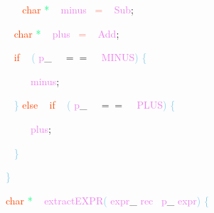 \documentclass[8, usernames, dvipsnames]{beamer}
\begin{document}
\begin{frame}
\textcolor{White}{\   }
\textcolor{White}{\   }
\textcolor{OrangeRed}{char}
\textcolor{SpringGreen}{*}
\textcolor{White}{\ }
\textcolor{Violet}{minus}\textcolor{White}{\ }
\textcolor{Salmon}{=}
\textcolor{White}{\ }
\textcolor{Violet}{Sub}\textcolor{Sepia}{;}

 \textcolor{White}{\   }
\textcolor{OrangeRed}{char}
\textcolor{SpringGreen}{*}
\textcolor{White}{\ }
\textcolor{Violet}{plus}\textcolor{White}{\ }
\textcolor{Salmon}{=}
\textcolor{White}{\ }
\textcolor{Violet}{Add}\textcolor{Sepia}{;}

 \textcolor{White}{\   }
\textcolor{OrangeRed}{if}
\textcolor{White}{\ }
\textcolor{SkyBlue}{(}
\textcolor{Violet}{p}\textcolor{Sepia}{\_}
\textcolor{White}{\ }
\textcolor{OliveGreen}{$==$}
\textcolor{White}{\ }
\textcolor{Violet}{MINUS}\textcolor{SkyBlue}{)}
\textcolor{SkyBlue}{\{ }

 \textcolor{White}{\   }
\textcolor{White}{\   }
\textcolor{OrangeRed}{	}
\textcolor{White}{\ }
\textcolor{Violet}{minus}\textcolor{Sepia}{;}

 \textcolor{White}{\   }
\textcolor{SkyBlue}{\} }
\textcolor{OrangeRed}{else}
\textcolor{White}{\ }
\textcolor{OrangeRed}{if}
\textcolor{White}{\ }
\textcolor{SkyBlue}{(}
\textcolor{Violet}{p}\textcolor{Sepia}{\_}
\textcolor{White}{\ }
\textcolor{OliveGreen}{$==$}
\textcolor{White}{\ }
\textcolor{Violet}{PLUS}\textcolor{SkyBlue}{)}
\textcolor{SkyBlue}{\{ }

 \textcolor{White}{\   }
\textcolor{White}{\   }
\textcolor{OrangeRed}{	}
\textcolor{White}{\ }
\textcolor{Violet}{plus}\textcolor{Sepia}{;}

 \textcolor{White}{\   }
\textcolor{SkyBlue}{\} }

 \textcolor{SkyBlue}{\} }

 
 \textcolor{OrangeRed}{char}
\textcolor{SpringGreen}{*}
\textcolor{White}{\ }
\textcolor{Violet}{extractEXPR}\textcolor{SkyBlue}{(}
\textcolor{Violet}{expr}\textcolor{Sepia}{\_}
\textcolor{Violet}{rec}\textcolor{White}{\ }
\textcolor{Violet}{p}\textcolor{Sepia}{\_}
\textcolor{Violet}{expr}\textcolor{SkyBlue}{)}
\textcolor{SkyBlue}{\{ }

 \end{frame}
\end{document}
